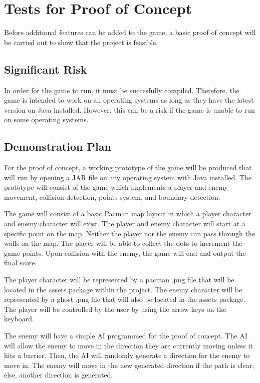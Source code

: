 \documentclass[12pt, titlepage]{article}
\begin{document}
\section{Tests for Proof of Concept}

Before additional features can be added to the game, a basic proof of concept will be carried out to show that the project is feasible. 

\subsection{Significant Risk}

In order for the game to run, it must be succesfully compiled. Therefore, the game is intended to work on all operating systems as long as they have the latest version on Java installed. However, this can be a risk if the game is unable to run on some operating systems.

\subsection{Demonstration Plan}

For the proof of concept, a working prototype of the game will be produced that will run by opening a JAR file on any operating system with Java installed. The prototype will consist of the game which implements a player and enemy movement, collision detection, points system, and boundary detection.

	The game will consist of a basic Pacman map layout in which a player character and enemy character will exist. The player and enemy character will start at a specific point on the map. Neither the player nor the enemy can pass through the walls on the map. The player will be able to collect the dots to increment the game points. Upon collision with the enemy, the game will end and output the final score.

	The player character will be represented by a pacman .png file that will be located in the assets package within the project. The enemy character will be represented by a ghost .png file that will also be located in the assets package. The player will be controlled by the user by using the arrow keys on the keyboard.

	The enemy will have a simple AI programmed for the proof of concept. The AI will allow the enemy to move in the direction they are currently moving unless it hits a barrier. Then, the AI will randomly generate a direction for the enemy to move in. The enemy will move in the new generated direction if the path is clear, else, another direction is generated.
		
\end{document}
